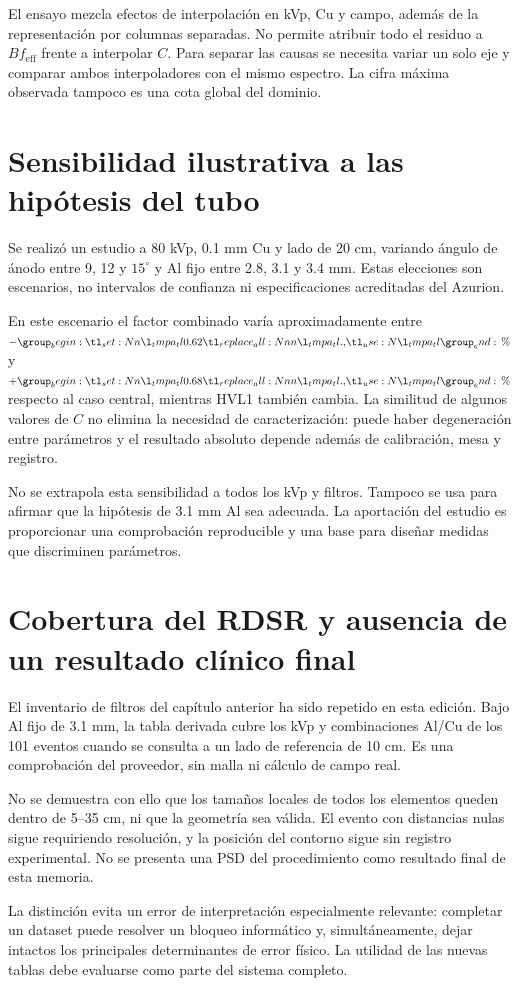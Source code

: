 El ensayo mezcla efectos de interpolación en kVp, Cu y campo, además de la representación por columnas separadas. No permite atribuir todo el residuo a $Bf_{\mathrm{eff}}$ frente a interpolar $C$. Para separar las causas se necesita variar un solo eje y comparar ambos interpoladores con el mismo espectro. La cifra máxima observada tampoco es una cota global del dominio.

\section{Sensibilidad ilustrativa a las hipótesis del tubo}
Se realizó un estudio a 80 kVp, \num{0.1} mm Cu y lado de 20 cm, variando ángulo de ánodo entre 9, 12 y $15^\circ$ y Al fijo entre \num{2.8}, \num{3.1} y \num{3.4} mm. Estas elecciones son escenarios, no intervalos de confianza ni especificaciones acreditadas del Azurion.
\begin{table}[htbp]\centering\small
\caption{Escenarios de ángulo y filtración fija. Diferencia respecto a $12^\circ$ y \num{3.1} mm Al.}

\end{table}
En este escenario el factor combinado varía aproximadamente entre $-\num{0.62}\,\text{\char37}$ y $+\num{0.68}\,\text{\char37}$ respecto al caso central, mientras HVL1 también cambia. La similitud de algunos valores de $C$ no elimina la necesidad de caracterización: puede haber degeneración entre parámetros y el resultado absoluto depende además de calibración, mesa y registro.

No se extrapola esta sensibilidad a todos los kVp y filtros. Tampoco se usa para afirmar que la hipótesis de \num{3.1} mm Al sea adecuada. La aportación del estudio es proporcionar una comprobación reproducible y una base para diseñar medidas que discriminen parámetros.

\section{Cobertura del RDSR y ausencia de un resultado clínico final}
El inventario de filtros del capítulo anterior ha sido repetido en esta edición. Bajo Al fijo de \num{3.1} mm, la tabla derivada cubre los kVp y combinaciones Al/Cu de los 101 eventos cuando se consulta a un lado de referencia de 10 cm. Es una comprobación del proveedor, sin malla ni cálculo de campo real.

No se demuestra con ello que los tamaños locales de todos los elementos queden dentro de 5--35 cm, ni que la geometría sea válida. El evento con distancias nulas sigue requiriendo resolución, y la posición del contorno sigue sin registro experimental. No se presenta una PSD del procedimiento como resultado final de esta memoria.

La distinción evita un error de interpretación especialmente relevante: completar un dataset puede resolver un bloqueo informático y, simultáneamente, dejar intactos los principales determinantes de error físico. La utilidad de las nuevas tablas debe evaluarse como parte del sistema completo.
\FloatBarrier
